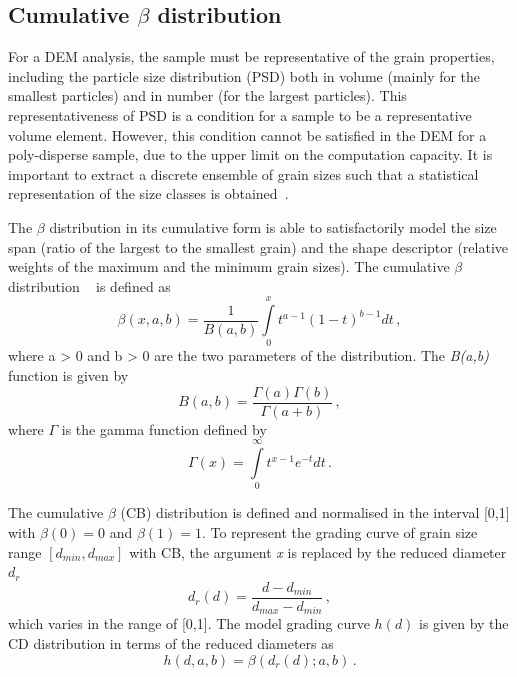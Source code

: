 \subsection[Cumulative beta distribution]{Cumulative $\beta$ distribution}
\label{sec:beta_dist}
For a DEM analysis, the sample must be representative of the 
grain properties, including the particle size distribution (PSD) both in volume 
(mainly for the smallest particles) and in number (for the largest particles). 
This representativeness of PSD is a condition for a sample to be a 
representative volume element. However, this condition cannot be satisfied in 
the DEM for a poly-disperse sample, due to the upper limit on the computation 
capacity. It is important to extract a discrete ensemble of grain sizes such 
that a statistical representation of the size classes is 
obtained~\citep{Radjai2011}.

The $\beta$ distribution in its cumulative form is able to satisfactorily model 
the size span (ratio of the largest to the smallest grain) and the shape 
descriptor (relative weights of the maximum and the minimum grain sizes). The 
cumulative $\beta$ distribution ~\citep{Voivret2007} is defined as
%
\begin{equation}
\beta(x,a,b) = \frac{1}{B(a,b)}\int\limits_{0}^{x}t^{a-1}(1-t)^{b-1}dt \,,
\end{equation}
%
where a > 0 and b > 0 are the two parameters of the distribution. The 
\textit{B(a,b)} function is given by
%
\begin{equation}
B(a,b) = \frac{\Gamma(a)\Gamma(b)}{\Gamma(a+b)} \,,
\end{equation}
%
where $\Gamma$ is the gamma function defined by
%
\begin{equation}
\Gamma(x) = \int\limits_{0}^{\infty}t^{x-1}e^{-t}dt \,.
\end{equation}

The cumulative $\beta$ (CB) distribution is defined and normalised in the 
interval [0,1] with $\beta(0) = 0$ and  $\beta(1) = 1$. To represent the 
grading curve of grain size range $[d_{min},d_{max}]$ with CB, the argument 
\textit{x} is replaced by the reduced diameter $d_r$
%
\begin{equation}
d_r(d) = \frac{d - d_{min}}{d_{max} - d_{min}} \,,
\end{equation}
%
which varies in the range of [0,1]. The model grading curve $h(d)$ is given by 
the CD distribution in terms of the reduced diameters as
%
\begin{equation}
h(d,a,b) = \beta(d_r(d);a,b) \,.
\end{equation}

